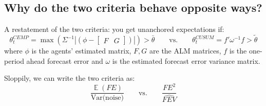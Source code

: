 \documentclass[11pt]{article}
\renewcommand{\[}{\begin{equation}}
\renewcommand{\]}{\end{equation}}
\DeclareMathOperator{\E}{\mathbb{E}}
\begin{document}
\subsection{Why do the two criteria behave opposite ways?}

A restatement of the two criteria: you get unanchored expectations if:
\begin{equation}
\theta_t^{CEMP} = \max(\Sigma^{-1}| ( \phi - \begin{bmatrix} F & G \end{bmatrix}) |) > \bar{\theta} \quad \quad \text{vs.} \quad \quad  \theta_t^{CUSUM} = f' \omega^{-1}f > \tilde{\theta}
\end{equation}
where $\phi$ is the agents' estimated matrix, $F,G$ are the ALM matrices, $f$ is the one-period ahead forecast error and $\omega$ is the estimated forecast error variance matrix. 

Sloppily, we can write the two criteria as:
\begin{equation}
\frac{\E(FE)}{\text{Var(noise)}} \quad \quad \text{vs.} \quad \quad \frac{FE^2}{\hat{FEV}}
\end{equation}
\end{document}

